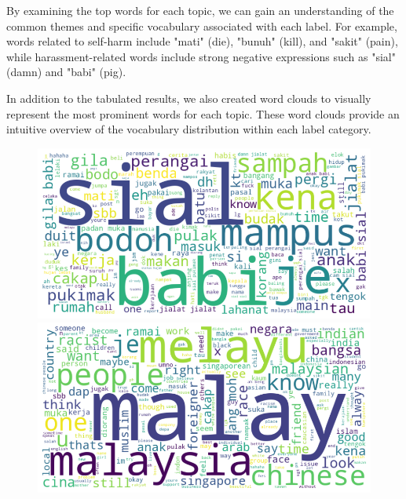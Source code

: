 \documentclass[preprint]{article}
\begin{document}
By examining the top words for each topic, we can gain an understanding of the common themes and specific vocabulary associated with each label. For example, words related to self-harm include "mati" (die), "bunuh" (kill), and "sakit" (pain), while harassment-related words include strong negative expressions such as "sial" (damn) and "babi" (pig).

In addition to the tabulated results, we also created word clouds to visually represent the most prominent words for each topic. These word clouds provide an intuitive overview of the vocabulary distribution within each label category.


\begin{figure}[h]
\centering
\begin{minipage}[b]{0.45\textwidth}
\centering
\includegraphics[width=\linewidth]{img/harassment-wordcloud.png}
\end{minipage}
\hfill
\begin{minipage}[b]{0.45\textwidth}
\centering
\includegraphics[width=\linewidth]{img/racist-wordcloud.png}
\end{minipage}
\end{figure}
\end{document}
